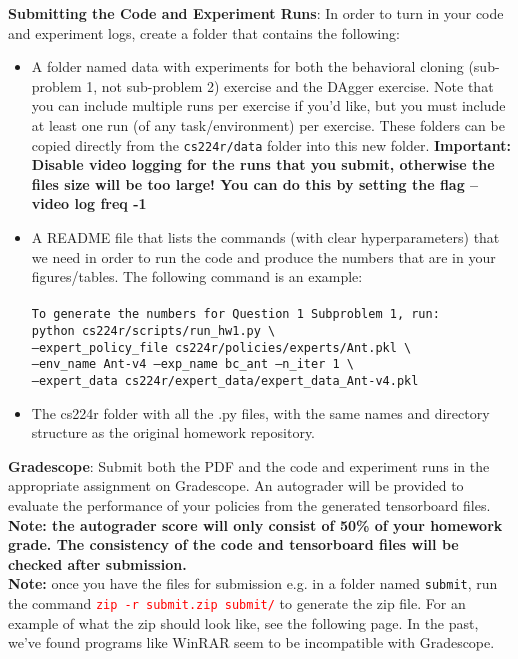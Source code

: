 \documentclass[12pt]{article}
\begin{document}
\noindent\textbf{Submitting the Code and Experiment Runs}: In order to turn in your code and experiment logs, create a folder that contains the following:
\begin{itemize}
\item A folder named data with experiments for both the behavioral cloning (sub-problem 1, not sub-problem 2) exercise and the DAgger exercise. Note that you can include multiple runs per exercise if you’d like, but you must include at least one run (of any task/environment) per exercise. These folders can be copied directly from the \texttt{cs224r/data} folder into this new folder. \textbf{Important: Disable video logging for the runs that you submit, otherwise the files size will be too large! You can do this by setting the flag --video log freq -1}
\item A README file that lists the commands (with clear hyperparameters) that we need in order to run the code and produce the numbers that are in your figures/tables. The following command is an example:\\
\\
\texttt{To generate the numbers for Question 1 Subproblem 1, run: \\
python cs224r/scripts/run\_hw1.py \textbackslash \\
    --expert\_policy\_file cs224r/policies/experts/Ant.pkl \textbackslash \\
    --env\_name Ant-v4 --exp\_name bc\_ant --n\_iter 1 \textbackslash \\
    --expert\_data cs224r/expert\_data/expert\_data\_Ant-v4.pkl }
\item The cs224r folder with all the .py files, with the same names and directory structure as the original homework repository. 
\end{itemize} 

\noindent\textbf{Gradescope}: Submit both the PDF and the code and experiment runs in the appropriate assignment on Gradescope. An autograder will be provided to evaluate the performance of your policies from the generated tensorboard files. \textbf{Note: the autograder score will only consist of 50\% of your homework grade. The consistency of the code and tensorboard files will be checked after submission.}\\

\noindent\textbf{Note:} once you have the files for submission e.g. in a folder named \texttt{submit}, run the command \textcolor{red}{\texttt{zip -r submit.zip submit/}} to generate the zip file. For an example of what the zip should look like, see the following page. In the past, we've found programs like WinRAR seem to be incompatible with Gradescope.\\
\end{document}
